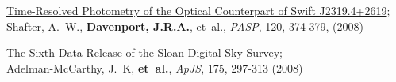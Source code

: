\documentclass{article}
\begin{document}
\begin{llist}
\begin{etaremune}[leftmargin=10pt]
\item {\sc \href{http://adsabs.harvard.edu/abs/2008PASP..120..374S}{\color{NavyBlue}Time-Resolved Photometry of the Optical Counterpart of Swift J2319.4+2619}};\\
Shafter, A.~W., {\bf Davenport, J.R.A.}, et~al., {\em PASP}, 120, 374-379, (2008)

\item {\sc \href{http://adsabs.harvard.edu/abs/2008ApJS..175..297A}{\color{NavyBlue}The Sixth Data Release of the Sloan Digital Sky Survey}};\\
Adelman-McCarthy, J.~K, {\bf et~al.}, {\em ApJS}, 175, 297-313 (2008)
  
\end{etaremune}

\thispagestyle{empty}




%
%
%
%
%
%
%
%
%
%
%



\end{llist}
\end{document}
